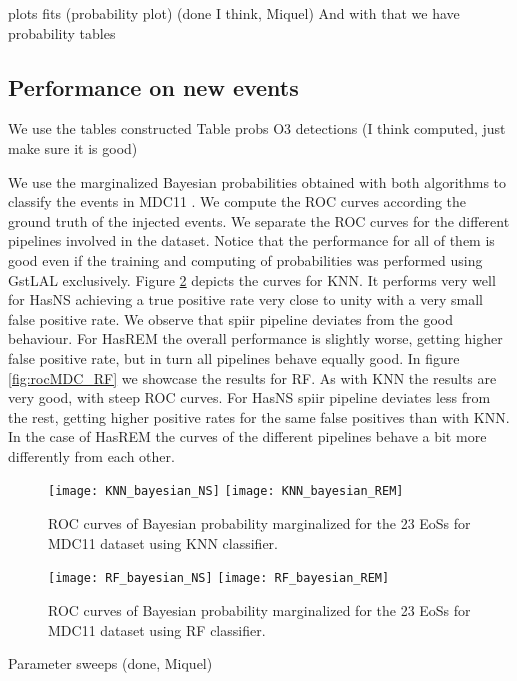 plots fits (probability plot) (done I think, Miquel)
And with that we have probability tables

\subsection{Performance on new events}
We use the tables constructed 
Table probs O3 detections (I think computed, just make sure it is good) 

We use the marginalized Bayesian probabilities obtained with both algorithms to classify the events in MDC11 . We compute the ROC curves according the ground truth of the injected events. We separate the ROC curves for the different pipelines involved in the dataset. Notice that the performance for all of them is good even if the training and computing of probabilities was performed using GstLAL exclusively. Figure \ref{fig:rocMDC_KNN} depicts the curves for KNN. It performs very well for \ac{HasNS} achieving a true positive rate very close to unity with a very small false positive rate. We observe that spiir pipeline deviates from the good behaviour. For \ac{HasREM} the overall performance is slightly worse, getting higher false positive rate, but in turn all pipelines behave equally good. In figure \ref{fig:rocMDC_RF} we showcase the results for \ac{RF}. As with \ac{KNN} the results are very good, with steep ROC curves. For \ac{HasNS} spiir pipeline deviates less from the rest, getting higher positive rates for the same false positives than with \ac{KNN}. In the case of \ac{HasREM} the curves of the different pipelines behave a bit more differently from each other.

\begin{figure}[h]
\texttt{[image: KNN\_bayesian\_NS]}
\texttt{[image: KNN\_bayesian\_REM]}
\caption{\label{fig:rocMDC_KNN}ROC curves of Bayesian probability marginalized for the 23 EoSs for MDC11 dataset using \ac{KNN} classifier.}
\end{figure}

\begin{figure}[h]
\texttt{[image: RF\_bayesian\_NS]}
\texttt{[image: RF\_bayesian\_REM]}
\caption{\label{fig:rocMDC_KNN}ROC curves of Bayesian probability marginalized for the 23 EoSs for MDC11 dataset using \ac{RF} classifier.}
\end{figure}


Parameter sweeps (done, Miquel)


